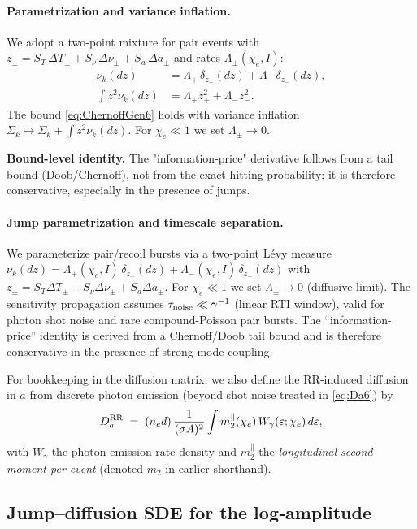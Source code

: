 \documentclass[aps,pre,twocolumn,showpacs,superscriptaddress]{revtex4-2}
\theoremstyle{definition}
\begin{document}
\paragraph*{Parametrization and variance inflation.}
We adopt a two-point mixture for pair events with $z_\pm=S_T\,\Delta T_\pm + S_\nu\,\Delta \nu_\pm + S_a\,\Delta a_\pm$ and rates $\Lambda_\pm(\chi_e,I)$:
\begin{align}\label{eq:nu-two-point-main}
\nu_k(dz) &=\Lambda_+\,\delta_{z_+}(dz)+\Lambda_-\,\delta_{z_-}(dz),\\
\int z^2 \nu_k(dz) &=\Lambda_+ z_+^2+\Lambda_- z_-^2.\nonumber
\end{align}
The bound \eqref{eq:ChernoffGen6} holds with variance inflation $\Sigma_k\mapsto \Sigma_k+\int z^2\nu_k(dz)$. For $\chi_e\ll 1$ we set $\Lambda_\pm\to 0$.

\noindent\textbf{Bound-level identity.}
The "information-price" derivative follows from a tail bound (Doob/Chernoff), not from the exact hitting probability; it is therefore conservative, especially in the presence of jumps.

\paragraph*{Jump parametrization and timescale separation.}
We parameterize pair/recoil bursts via a two-point L{\'e}vy measure
$\nu_k(dz)=\Lambda_+(\chi_e,I)\,\delta_{z_+}(dz)+\Lambda_-(\chi_e,I)\,\delta_{z_-}(dz)$ with
$z_\pm=S_T\Delta T_\pm+S_\nu\Delta\nu_\pm+S_a\Delta a_\pm$. For $\chi_e\ll 1$ we set $\Lambda_\pm\to 0$ (diffusive limit).
The sensitivity propagation assumes $\tau_{\rm noise}\ll \gamma^{-1}$ (linear RTI window), valid for photon shot noise
and rare compound-Poisson pair bursts. The ``information-price'' identity is derived from a Chernoff/Doob tail bound
and is therefore conservative in the presence of strong mode coupling.

For bookkeeping in the diffusion matrix, we also define the RR‑induced diffusion in $a$ from discrete photon emission (beyond shot noise treated in \eqref{eq:Da6}) by
\[
D_a^{\rm RR} \;=\; (n_e d)\,\frac{1}{(\sigma A)^2}\int m_2^\parallel(\chi_e)\,W_\gamma(\varepsilon;\chi_e)\,d\varepsilon,
\]
with $W_\gamma$ the photon emission rate density and $m_2^\parallel$ the \emph{longitudinal second moment per event} (denoted $m_2$ in earlier shorthand).

\subsection{Jump–diffusion SDE for the log‑amplitude}\label{subsec:SDE6}
\end{document}
